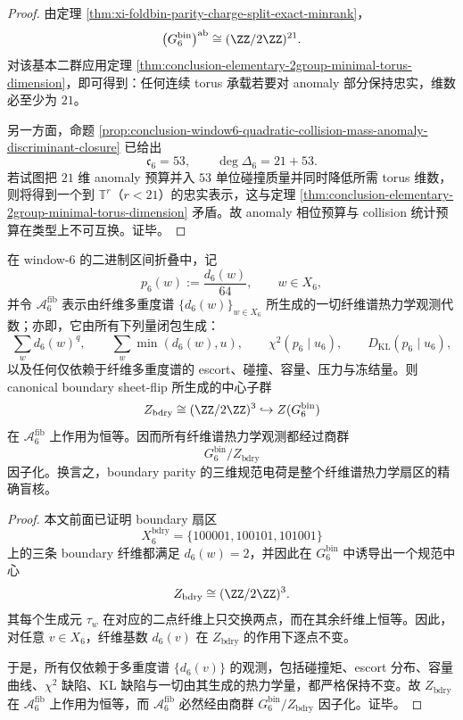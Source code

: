 \begin{proof}
由定理 \ref{thm:xi-foldbin-parity-charge-split-exact-minrank}，
\[
\bigl(G_6^{\mathrm{bin}}\bigr)^{\mathrm{ab}}\cong (\ZZ/2\ZZ)^{21}.
\]
对该基本二群应用定理 \ref{thm:conclusion-elementary-2group-minimal-torus-dimension}，即可得到：任何连续 torus 承载若要对 anomaly 部分保持忠实，维数必至少为 \(21\)。

另一方面，命题 \ref{prop:conclusion-window6-quadratic-collision-mass-anomaly-discriminant-closure} 已给出
\[
\mathfrak c_6=53,
\qquad
\deg\Delta_6=21+53.
\]
若试图把 \(21\) 维 anomaly 预算并入 \(53\) 单位碰撞质量并同时降低所需 torus 维数，则将得到一个到 \(\mathbb T^r\)（\(r<21\)）的忠实表示，这与定理 \ref{thm:conclusion-elementary-2group-minimal-torus-dimension} 矛盾。故 anomaly 相位预算与 collision 统计预算在类型上不可互换。证毕。
\end{proof}

\begin{theorem}\label{thm:conclusion-window6-boundary-parity-thermodynamic-blind-kernel}
在 window-\(6\) 的二进制区间折叠中，记
\[
p_6(w):=\frac{d_6(w)}{64},
\qquad
w\in X_6,
\]
并令 \(\mathcal A^{\mathrm{fib}}_6\) 表示由纤维多重度谱 \(\{d_6(w)\}_{w\in X_6}\) 所生成的一切纤维谱热力学观测代数；亦即，它由所有下列量闭包生成：
\[
\sum_w d_6(w)^q,\qquad
\sum_w \min(d_6(w),u),\qquad
\chi^2(p_6\mid u_6),\qquad
D_{\mathrm{KL}}(p_6\mid u_6),
\]
以及任何仅依赖于纤维多重度谱的 escort、碰撞、容量、压力与冻结量。则 canonical boundary sheet-flip 所生成的中心子群
\[
Z_{\mathrm{bdry}}\cong (\ZZ/2\ZZ)^3 \hookrightarrow Z(G_6^{\mathrm{bin}})
\]
在 \(\mathcal A^{\mathrm{fib}}_6\) 上作用为恒等。因而所有纤维谱热力学观测都经过商群
\[
G_6^{\mathrm{bin}}/Z_{\mathrm{bdry}}
\]
因子化。换言之，boundary parity 的三维规范电荷是整个纤维谱热力学扇区的精确盲核。
\end{theorem}

\begin{proof}
本文前面已证明 boundary 扇区
\[
X_6^{\mathrm{bdry}}=\{100001,100101,101001\}
\]
上的三条 boundary 纤维都满足 \(d_6(w)=2\)，并因此在 \(G_6^{\mathrm{bin}}\) 中诱导出一个规范中心
\[
Z_{\mathrm{bdry}}\cong (\ZZ/2\ZZ)^3.
\]
其每个生成元 \(\tau_w\) 在对应的二点纤维上只交换两点，而在其余纤维上恒等。因此，对任意 \(v\in X_6\)，纤维基数 \(d_6(v)\) 在 \(Z_{\mathrm{bdry}}\) 的作用下逐点不变。

于是，所有仅依赖于多重度谱 \(\{d_6(v)\}\) 的观测，包括碰撞矩、escort 分布、容量曲线、\(\chi^2\) 缺陷、KL 缺陷与一切由其生成的热力学量，都严格保持不变。故 \(Z_{\mathrm{bdry}}\) 在 \(\mathcal A^{\mathrm{fib}}_6\) 上作用为恒等，而 \(\mathcal A^{\mathrm{fib}}_6\) 必然经由商群 \(G_6^{\mathrm{bin}}/Z_{\mathrm{bdry}}\) 因子化。证毕。
\end{proof}

